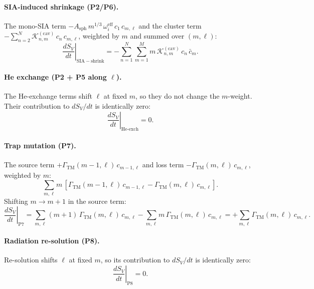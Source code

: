 \paragraph{SIA-induced shrinkage (P2/P6).}
The mono-SIA term $-A_{\mathrm{sph}}\,m^{1/3}\,\omega_i^{\mathrm{eff}}\,
c_1\,c_{m,\ell}$ and the cluster term $-\sum_{n=2}^N
\mathcal{K}_{n,m}^{(\mathrm{cav})}\,c_n\,c_{m,\ell}$, weighted by $m$ and
summed over $(m,\ell)$:
\begin{equation}\label{eq:P2i_SV}
    \left.\frac{dS_V}{dt}\right|_{\mathrm{SIA-shrink}}
    = -\sum_{n=1}^{N}\sum_{m=1}^{M}
      m\,\mathcal{K}_{n,m}^{(\mathrm{cav})}\,c_n\,\bar{c}_m.
\end{equation}

\paragraph{He exchange (P2 + P5 along $\ell$).}
The He-exchange terms shift $\ell$ at fixed $m$, so they do not change the
$m$-weight. Their contribution to $dS_V/dt$ is identically zero:
\begin{equation}
    \left.\frac{dS_V}{dt}\right|_{\text{He-exch}} = 0.
\end{equation}

\paragraph{Trap mutation (P7).}
The source term $+\Gamma_{\mathrm{TM}}(m{-}1,\ell)\,c_{m-1,\ell}$ and loss
term $-\Gamma_{\mathrm{TM}}(m,\ell)\,c_{m,\ell}$, weighted by $m$:
\begin{equation}
    \sum_{m,\ell} m\,[\Gamma_{\mathrm{TM}}(m{-}1,\ell)\,c_{m-1,\ell}
    - \Gamma_{\mathrm{TM}}(m,\ell)\,c_{m,\ell}].
\end{equation}
Shifting $m \to m+1$ in the source term:
\begin{equation}\label{eq:P7_SV}
    \left.\frac{dS_V}{dt}\right|_{\mathrm{P7}}
    = \sum_{m,\ell}(m{+}1)\,\Gamma_{\mathrm{TM}}(m,\ell)\,c_{m,\ell}
    - \sum_{m,\ell} m\,\Gamma_{\mathrm{TM}}(m,\ell)\,c_{m,\ell}
    = +\sum_{m,\ell}\Gamma_{\mathrm{TM}}(m,\ell)\,c_{m,\ell}.
\end{equation}

\paragraph{Radiation re-solution (P8).}
Re-solution shifts $\ell$ at fixed $m$, so its contribution to $dS_V/dt$
is identically zero:
\begin{equation}
    \left.\frac{dS_V}{dt}\right|_{\mathrm{P8}} = 0.
\end{equation}


